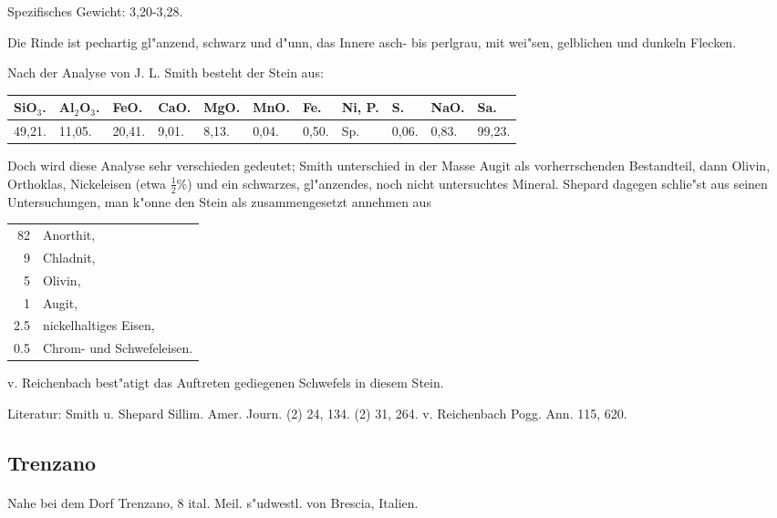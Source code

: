 \documentclass[a4paper, 11pt, oneside]{article}
\begin{document}
Spezifisches Gewicht: 3,20-3,28.

Die Rinde ist pechartig gl"anzend, schwarz und d"unn, das Innere asch- bis perlgrau, mit wei"sen, gelblichen und dunkeln Flecken.

Nach der Analyse von J. L. Smith besteht der Stein aus:
\begin{table}[!ht]
    \centering
    \footnotesize
    \begin{tabular}{l l l l l l l p{8mm} p{4mm} p{4mm} p{4mm}}
        SiO$_{3}$. & Al$_{2}$O$_{3}$. & FeO. & CaO. & MgO. & MnO. & Fe. & Ni, P. & S. & NaO. & Sa. \\ \hline
        49,21. & 11,05. & 20,41. & 9,01. & 8,13. & 0,04. & 0,50. & Sp. & 0,06. & 0,83. & 99,23. \\
    \end{tabular}
\end{table}

Doch wird diese Analyse sehr verschieden gedeutet; Smith unterschied in der Masse Augit als vorherrschenden Bestandteil, dann Olivin, Orthoklas, Nickeleisen (etwa $\frac{1}{2}$\%) und ein schwarzes, gl"anzendes, noch nicht untersuchtes Mineral. Shepard dagegen schlie"st aus seinen Untersuchungen, man k"onne den Stein als zusammengesetzt annehmen aus
\begin{table}[!ht]
    \centering
    \begin{tabular}{r l}
        82 & Anorthit, \\
        9 & Chladnit, \\
        5 & Olivin, \\
        1 & Augit, \\
        2.5 & nickelhaltiges Eisen, \\
        0.5 & Chrom- und Schwefeleisen.  \\
    \end{tabular}
\end{table}

v. Reichenbach best"atigt das Auftreten gediegenen Schwefels in diesem Stein.

\footnotesize
Literatur: Smith u. Shepard Sillim. Amer. Journ. (2) 24, 134. (2) 31, 264. v. Reichenbach Pogg. Ann. 115, 620.

\subsection{Trenzano}
\normalsize
\paragraph{}
Nahe bei dem Dorf Trenzano, 8 ital. Meil. s"udwestl. von Brescia, Italien.
\end{document}
